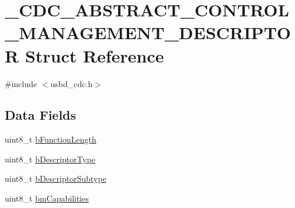 \hypertarget{struct__CDC__ABSTRACT__CONTROL__MANAGEMENT__DESCRIPTOR}{\section{\-\_\-\-C\-D\-C\-\_\-\-A\-B\-S\-T\-R\-A\-C\-T\-\_\-\-C\-O\-N\-T\-R\-O\-L\-\_\-\-M\-A\-N\-A\-G\-E\-M\-E\-N\-T\-\_\-\-D\-E\-S\-C\-R\-I\-P\-T\-O\-R Struct Reference}
\label{struct__CDC__ABSTRACT__CONTROL__MANAGEMENT__DESCRIPTOR}
}


{\ttfamily \#include $<$usbd\-\_\-cdc.\-h$>$}

\subsection*{Data Fields}
\begin{DoxyCompactItemize}
\item 
uint8\-\_\-t \hyperlink{struct__CDC__ABSTRACT__CONTROL__MANAGEMENT__DESCRIPTOR_a97e809e9fd90d0da48f3fc083e6ffc01}{b\-Function\-Length}
\item 
uint8\-\_\-t \hyperlink{struct__CDC__ABSTRACT__CONTROL__MANAGEMENT__DESCRIPTOR_a5a7671be987b15ea0a360d4d0ba8981c}{b\-Descriptor\-Type}
\item 
uint8\-\_\-t \hyperlink{struct__CDC__ABSTRACT__CONTROL__MANAGEMENT__DESCRIPTOR_a102b3c47bb589d906fa0ba2f383a8306}{b\-Descriptor\-Subtype}
\item 
uint8\-\_\-t \hyperlink{struct__CDC__ABSTRACT__CONTROL__MANAGEMENT__DESCRIPTOR_a42f90ae883dfbe07a590de4874972599}{bm\-Capabilities}
\end{DoxyCompactItemize}


